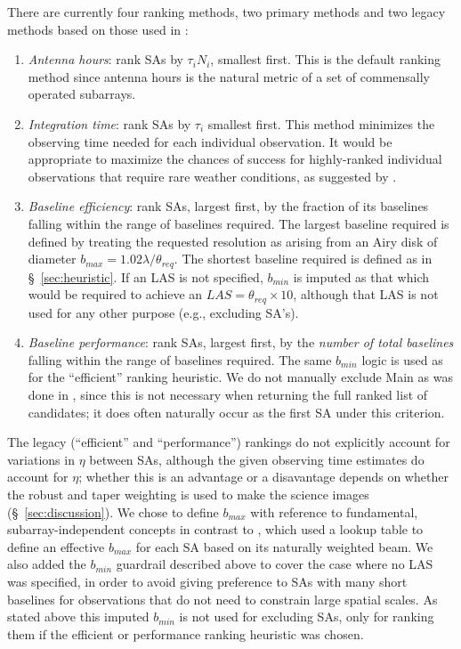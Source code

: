 \documentclass[11pt]{article}
\begin{document}
There are currently four ranking methods, two primary methods and two
legacy methods based on those used in \cite{memo121}:
\begin{enumerate}
\item {\it Antenna hours}: rank SAs by $\tau_i N_i$, smallest first.
  This is the default ranking method since antenna hours is the
  natural metric of a set of commensally operated subarrays.
\item {\it Integration time}: rank SAs by $\tau_i$ smallest first.
  This method minimizes the observing time needed for each individual
  observation. It would be appropriate to maximize the chances
  of success for highly-ranked individual observations that require
  rare weather conditions, as suggested by \cite{saNarrative}.
\item {\it Baseline efficiency}: rank SAs, largest first, by the
  fraction of its baselines falling within the range of baselines
  required. The largest baseline required is defined by treating the
  requested resolution as arising from an Airy disk of diameter
  $b_{max} = 1.02 \lambda/\theta_{req}$.  The shortest baseline
  required is defined as in \S~\ref{sec:heuristic}.  If an LAS is not
  specified, $b_{min}$ is imputed as that which would be required to
  achieve an $LAS = \theta_{req} \times 10$, although that LAS is not
  used for any other purpose (e.g., excluding SA's).
\item {\it Baseline performance}: rank SAs, largest first, by the {\it
  number of total baselines} falling within the range of baselines
  required. The same $b_{min}$ logic is used as for the ``efficient''
  ranking heuristic. We do not manually exclude Main as was done in
  \cite{memo121}, since this is not necessary when returning the full
  ranked list of candidates; it does often naturally occur as the
  first SA under this criterion.
\end{enumerate}
The legacy (``efficient'' and ``performance'') rankings do not
explicitly account for variations in $\eta$ between SAs, although the
given observing time estimates do account for $\eta$; whether this is
an advantage or a disavantage depends on whether the robust and taper
weighting is used to make the science images
(\S~\ref{sec:discussion}).  We chose to define $b_{max}$ with
reference to fundamental, subarray-independent concepts in contrast to
\cite{memo121}, which used a lookup table to define an effective
$b_{max}$ for each SA based on its naturally weighted beam. We also
added the $b_{min}$ guardrail described above to cover the case where
no LAS was specified, in order to avoid giving preference to SAs with
many short baselines for observations that do not need to constrain
large spatial scales. As stated above this imputed $b_{min}$ is not
used for excluding SAs, only for ranking them if the efficient or
performance ranking heuristic was chosen.
\end{document}
